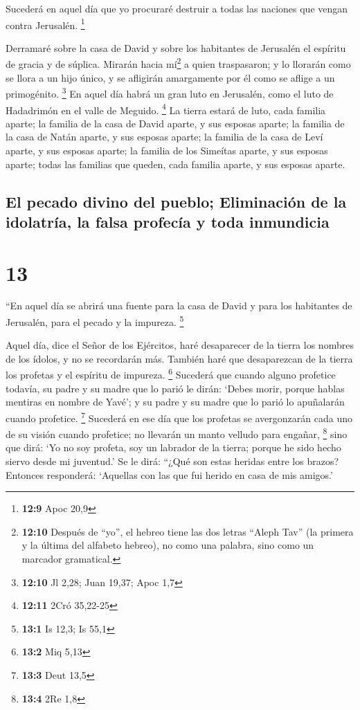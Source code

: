  Sucederá en aquel día que yo procuraré destruir a todas
las naciones que vengan contra Jerusalén. \footnote{\textbf{12:9} Apoc
  20,9}

 Derramaré sobre la casa de David y sobre los habitantes
de Jerusalén el espíritu de gracia y de súplica. Mirarán hacia
mí\footnote{\textbf{12:10} Después de ``yo'', el hebreo tiene las dos
  letras ``Aleph Tav'' (la primera y la última del alfabeto hebreo), no
  como una palabra, sino como un marcador gramatical.} a quien
traspasaron; y lo llorarán como se llora a un hijo único, y se afligirán
amargamente por él como se aflige a un primogénito. \footnote{\textbf{12:10}
  Jl 2,28; Juan 19,37; Apoc 1,7}  En aquel día habrá un
gran luto en Jerusalén, como el luto de Hadadrimón en el valle de
Meguido. \footnote{\textbf{12:11} 2Cró 35,22-25}  La
tierra estará de luto, cada familia aparte; la familia de la casa de
David aparte, y sus esposas aparte; la familia de la casa de Natán
aparte, y sus esposas aparte;  la familia de la casa de
Leví aparte, y sus esposas aparte; la familia de los Simeítas aparte, y
sus esposas aparte;  todas las familias que queden, cada
familia aparte, y sus esposas aparte.

\hypertarget{el-pecado-divino-del-pueblo-eliminaciuxf3n-de-la-idolatruxeda-la-falsa-profecuxeda-y-toda-inmundicia}{%
\subsection{El pecado divino del pueblo; Eliminación de la idolatría, la
falsa profecía y toda
inmundicia}\label{el-pecado-divino-del-pueblo-eliminaciuxf3n-de-la-idolatruxeda-la-falsa-profecuxeda-y-toda-inmundicia}}

\hypertarget{section-12}{%
\section{13}\label{section-12}}

 ``En aquel día se abrirá una fuente para la casa de David
y para los habitantes de Jerusalén, para el pecado y la impureza.
\footnote{\textbf{13:1} Is 12,3; Is 55,1}

 Aquel día, dice el Señor de los Ejércitos, haré
desaparecer de la tierra los nombres de los ídolos, y no se recordarán
más. También haré que desaparezcan de la tierra los profetas y el
espíritu de impureza. \footnote{\textbf{13:2} Miq 5,13} 
Sucederá que cuando alguno profetice todavía, su padre y su madre que lo
parió le dirán: `Debes morir, porque hablas mentiras en nombre de Yavé';
y su padre y su madre que lo parió lo apuñalarán cuando profetice.
\footnote{\textbf{13:3} Deut 13,5}  Sucederá en ese día
que los profetas se avergonzarán cada uno de su visión cuando profetice;
no llevarán un manto velludo para engañar, \footnote{\textbf{13:4} 2Re
  1,8}  sino que dirá: `Yo no soy profeta, soy un labrador
de la tierra; porque he sido hecho siervo desde mi juventud.'
 Se le dirá: ``¿Qué son estas heridas entre los brazos?
Entonces responderá: `Aquellas con las que fui herido en casa de mis
amigos.'

